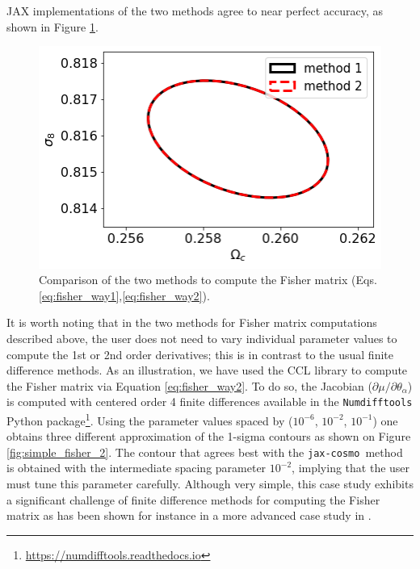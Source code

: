 \documentclass[twocolumn,twocolappendix,nofootinbib,iop]{openjournal}
\newcommand{\jaxcosmo}{\texttt{jax-cosmo}}
\begin{document}
JAX implementations of the two methods agree to near perfect accuracy, as shown in Figure \ref{fig:simple_fisher_1}.
\begin{figure}
    \centering
    \includegraphics[width=0.7\columnwidth]{figures/simple_fisher_1.png}
    \caption{Comparison of the two methods to compute the Fisher matrix (Eqs.\ref{eq:fisher_way1},\ref{eq:fisher_way2}).} 
    \label{fig:simple_fisher_1}
\end{figure}
%
It is worth noting that in the two methods for Fisher matrix computations described above, the user does not need to vary individual parameter values to compute the 1st or 2nd order derivatives; this is in contrast to the usual finite difference methods. As an illustration, we have used the CCL library to compute the Fisher matrix via Equation \ref{eq:fisher_way2}. To do so, the Jacobian ($\partial \mu/\partial\theta_\alpha$) is computed with centered  order 4 finite differences available in the \texttt{Numdifftools} Python package\footnote{\url{https://numdifftools.readthedocs.io}}. Using the parameter values spaced by ($10^{-6}$, $10^{-2}$, $10^{-1}$) one obtains three different approximation of the 1-sigma contours as shown on Figure \ref{fig:simple_fisher_2}. The contour that agrees best with the \jaxcosmo\ method is obtained with the intermediate spacing parameter $10^{-2}$, implying that the user must tune this parameter carefully. Although very simple, this case study exhibits a significant challenge of finite difference methods for computing the Fisher matrix as has been shown for instance in a more advanced case study in \citet{2021arXiv210100298B}. 
\end{document}
